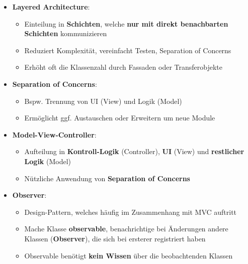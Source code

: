 \begin{itemize}
	\item \textbf{Layered Architecture}:
	\begin{itemize}
		\item Einteilung in \textbf{Schichten}, welche \textbf{nur mit direkt benachbarten Schichten} kommunizieren
		\item Reduziert Komplexität, vereinfacht Testen, Separation of Concerns
		\item Erhöht oft die Klassenzahl durch Fassaden oder Transferobjekte
	\end{itemize}
	\item \textbf{Separation of Concerns}:
	\begin{itemize}
		\item Bspw. Trennung von UI (View) und Logik (Model)
		\item Ermöglicht ggf. Austauschen oder Erweitern um neue Module
	\end{itemize}
	\item \textbf{Model-View-Controller}:
	\begin{itemize}
		\item Aufteilung in \textbf{Kontroll-Logik} (Controller), \textbf{UI} (View) und \textbf{restlicher Logik} (Model)
		\item Nützliche Anwendung von \textbf{Separation of Concerns}
	\end{itemize}
	\item \textbf{Observer}:
	\begin{itemize}
		\item Design-Pattern, welches häufig im Zusammenhang mit MVC auftritt
		\item Mache Klasse \textbf{observable}, benachrichtige bei Änderungen andere Klassen (\textbf{Observer}), die sich bei ersterer registriert haben
		\item Observable benötigt \textbf{kein Wissen} über die beobachtenden Klassen
	\end{itemize}
\end{itemize}